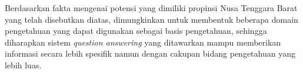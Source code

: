 Berdasarkan fakta mengenai potensi yang dimiliki propinsi Nusa Tenggara Barat yang telah disebutkan diatas, dimungkinkan untuk membentuk beberapa domain pengetahuan yang dapat digunakan sebagai basis pengetahuan, sehingga diharapkan sistem \emph{question answering} yang ditawarkan mampu memberikan informasi secara lebih spesifik namun dengan cakupan bidang pengetahuan yang lebih luas.


